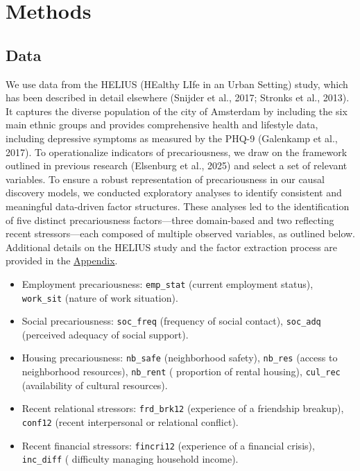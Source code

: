\documentclass[
]{article}
\providecommand{\tightlist}{%
  \setlength{\itemsep}{0pt}\setlength{\parskip}{0pt}}\usepackage{longtable,booktabs,array}
\begin{document}
\section{Methods}\label{methods}

\subsection{Data}\label{data}

We use data from the HELIUS (HEalthy LIfe in an Urban Setting) study,
which has been described in detail elsewhere (Snijder et al., 2017;
Stronks et al., 2013). It captures the diverse population of the city of
Amsterdam by including the six main ethnic groups and provides
comprehensive health and lifestyle data, including depressive symptoms
as measured by the PHQ-9 (Galenkamp et al., 2017). To operationalize
indicators of precariousness, we draw on the framework outlined in
previous research (Elsenburg et al., 2025) and select a set of relevant
variables. To ensure a robust representation of precariousness in our
causal discovery models, we conducted exploratory analyses to identify
consistent and meaningful data-driven factor structures. These analyses
led to the identification of five distinct precariousness
factors---three domain-based and two reflecting recent stressors---each
composed of multiple observed variables, as outlined below. Additional
details on the HELIUS study and the factor extraction process are
provided in the \hyperref[sec-appendix]{Appendix}.

\begin{itemize}
\tightlist
\item
  Employment precariousness: \texttt{emp\_stat} (current employment
  status), \texttt{work\_sit} (nature of work situation).
\item
  Social precariousness: \texttt{soc\_freq} (frequency of social
  contact), \texttt{soc\_adq} (perceived adequacy of social support).
\item
  Housing precariousness: \texttt{nb\_safe} (neighborhood safety),
  \texttt{nb\_res} (access to neighborhood resources), \texttt{nb\_rent}
  ( proportion of rental housing), \texttt{cul\_rec} (availability of
  cultural resources).
\item
  Recent relational stressors: \texttt{frd\_brk12} (experience of a
  friendship breakup), \texttt{conf12} (recent interpersonal or
  relational conflict).
\item
  Recent financial stressors: \texttt{fincri12} (experience of a
  financial crisis), \texttt{inc\_diff} ( difficulty managing household
  income).
\end{itemize}
\end{document}
